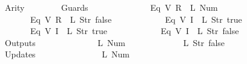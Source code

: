 \begin{isabellebody}
\ \ \ \ \ \ Arity\ {\isacharequal}\ {}{\isacharcomma}\isanewline
\ \ \ \ \ \ Guards\ {\isacharequal}\ {\isacharbrackleft}\isanewline
\ \ \ \ \ \ \ \ \ \ \ \ {\isacharparenleft}Eq\ {\isacharparenleft}V\ {\isacharparenleft}R\ {}{\isacharparenright}{\isacharparenright}\ {\isacharparenleft}L\ {\isacharparenleft}Num\ {}{\isacharparenright}{\isacharparenright}{\isacharparenright}{\isacharcomma}\isanewline
\ \ \ \ \ \ \ \ \ \ \ \ {\isacharparenleft}Eq\ {\isacharparenleft}V\ {\isacharparenleft}R\ {}{\isacharparenright}{\isacharparenright}\ {\isacharparenleft}L\ {\isacharparenleft}Str\ {\isacharprime}{\isacharprime}false{\isacharprime}{\isacharprime}{\isacharparenright}{\isacharparenright}{\isacharparenright}{\isacharcomma}\isanewline
\ \ \ \ \ \ \ \ \ \ \ \ {\isacharparenleft}Eq\ {\isacharparenleft}V\ {\isacharparenleft}I\ {}{\isacharparenright}{\isacharparenright}\ {\isacharparenleft}L\ {\isacharparenleft}Str\ {\isacharprime}{\isacharprime}true{\isacharprime}{\isacharprime}{\isacharparenright}{\isacharparenright}{\isacharparenright}{\isacharcomma}\isanewline
\ \ \ \ \ \ \ \ \ \ \ \ {\isacharparenleft}Eq\ {\isacharparenleft}V\ {\isacharparenleft}I\ {}{\isacharparenright}{\isacharparenright}\ {\isacharparenleft}L\ {\isacharparenleft}Str\ {\isacharprime}{\isacharprime}true{\isacharprime}{\isacharprime}{\isacharparenright}{\isacharparenright}{\isacharparenright}{\isacharcomma}\isanewline
\ \ \ \ \ \ \ \ \ \ \ \ {\isacharparenleft}Eq\ {\isacharparenleft}V\ {\isacharparenleft}I\ {}{\isacharparenright}{\isacharparenright}\ {\isacharparenleft}L\ {\isacharparenleft}Str\ {\isacharprime}{\isacharprime}false{\isacharprime}{\isacharprime}{\isacharparenright}{\isacharparenright}{\isacharparenright}\isanewline
\ \ \ \ \ \ {\isacharbrackright}{\isacharcomma}\isanewline
\ \ \ \ \ \ Outputs\ {\isacharequal}\ {\isacharbrackleft}\isanewline
\ \ \ \ \ \ \ \ \ \ \ \ {\isacharparenleft}L\ {\isacharparenleft}Num\ {}{\isacharparenright}{\isacharparenright}{\isacharcomma}\isanewline
\ \ \ \ \ \ \ \ \ \ \ \ {\isacharparenleft}L\ {\isacharparenleft}Str\ {\isacharprime}{\isacharprime}false{\isacharprime}{\isacharprime}{\isacharparenright}{\isacharparenright}\isanewline
\ \ \ \ \ \ {\isacharbrackright}{\isacharcomma}\isanewline
\ \ \ \ \ \ Updates\ {\isacharequal}\ {\isacharbrackleft}\isanewline
\ \ \ \ \ \ \ \ \ \ \ \ {\isacharparenleft}{}{\isacharcomma}\ {\isacharparenleft}L\ {\isacharparenleft}Num\ {}{\isacharparenright}{\isacharparenright}{\isacharparenright}{\isacharcomma}\isanewline

\end{isabellebody}
